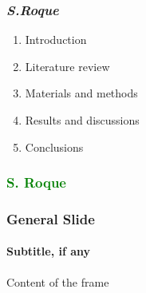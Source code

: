 \documentclass[aspectratio=169]{beamer}
\begin{document}


\maketitle

\begin{frame}
    \frametitle{\emph{S.Roque}}
\begin{enumerate}
\setcounter{enumi}{0}
\itemsep0.75em
\item Introduction
\item Literature review
\item Materials and methods
\item Results and discussions
\item Conclusions
\end{enumerate}    

\end{frame}



\begin{frame}
\frametitle{\textcolor{green}{S. Roque}}
\begin{center}
\end{center}
\begin{center}
\end{center}
\end{frame}

\begin{frame}

\frametitle{General Slide}
\framesubtitle{Subtitle, if any}
Content of the frame

\end{frame}
\end{document}
